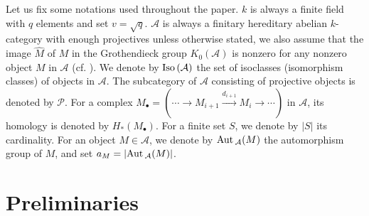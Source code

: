 \documentclass[reqno,12pt]{amsart}
\numberwithin{equation}{section}
\def\A{{\mathcal A}}\def\P{{\mathscr{P}}}
\theoremstyle{plain} %
\theoremstyle{definition} %
\begin{document}
Let us fix some notations used throughout the paper.
$k$ is always a finite field with $q$ elements and set $v=\sqrt{q}$. $\A$ is always a finitary hereditary abelian $k$-category with enough projectives unless otherwise stated, we also assume that the image $\hat{M}$ of $M$ in the Grothendieck group $K_0(\mathcal{A})$ is nonzero for any nonzero object $M$ in $\mathcal{A}$ (cf. \cite{Br,Yan}).
We denote by $\mbox{\rm Iso}\,(\mathcal{A})$ the set of isoclasses (isomorphism classes) of objects in $\mathcal{A}$. The subcategory of $\mathcal{A}$ consisting of projective objects is denoted by $\mathscr{P}$.
For a complex $M_\bullet=(\cdots\rightarrow M_{i+1}\xrightarrow{d_{i+1}} M_{i}\rightarrow\cdots)$ in $\mathcal{A}$, its homology is denoted by $H_\ast(M_\bullet)$.
For a finite set $S$, we denote by $|S|$ its cardinality. For an object $M\in\A$, we denote by $\Aut_{\A}(M)$ the automorphism group of $M$, and set $a_M=|\Aut_{\A}(M)|$.


\section{Preliminaries}
\end{document}
